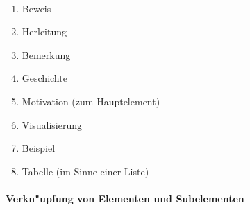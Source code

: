\mbox{ }
\vspace{0mm}


    \begin{enumerate}
    \item Beweis
    \item Herleitung
    \item Bemerkung 
    \item Geschichte
    \item Motivation (zum Hauptelement)
    \item Visualisierung
    \item Beispiel
    \item Tabelle (im Sinne einer Liste)
    \end{enumerate}


\paragraph{Verkn"upfung von Elementen und Subelementen}\label{elemente_und_sub_elemente}

\mbox{ }
\vspace{0mm}

